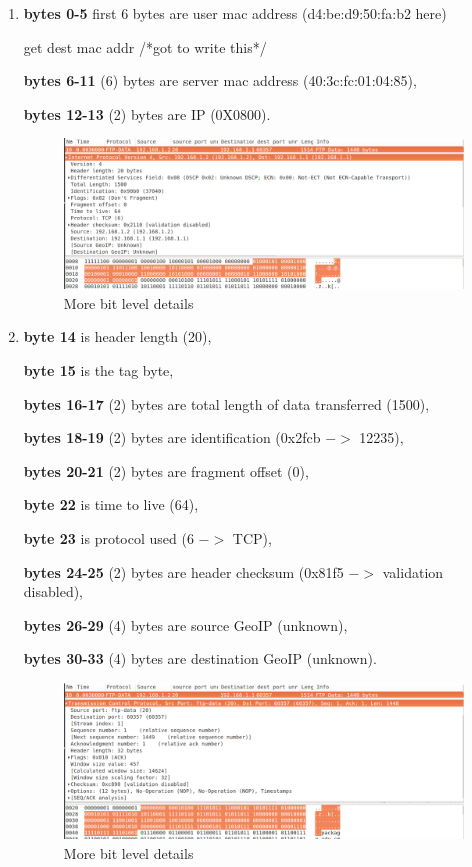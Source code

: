 \begin{enumerate}
\item {\bf bytes 0-5} first 6 bytes are user mac 
address (d4:be:d9:50:fa:b2 here)

\begin{chunk}{get dest mac addr}
/*got to write this*/
\end{chunk}

{\bf bytes 6-11} (6) bytes are server mac 
address (40:3c:fc:01:04:85), 

{\bf bytes 12-13} (2) bytes are IP (0X0800).

\newpage
\begin{figure}[ht!]
\centering
\includegraphics[scale=0.35]{eps/ftp8.eps}
\caption{More bit level details}
\label{ftp8}
\end{figure}

\item {\bf byte 14} is header length (20), 

{\bf byte 15} is the tag byte, 

{\bf bytes 16-17} (2) bytes are total length of data transferred (1500), 

{\bf bytes 18-19} (2) bytes are identification (0x2fcb $->$ 12235), 

{\bf bytes 20-21} (2) bytes are fragment offset (0), 

{\bf byte 22} is time to live (64), 

{\bf byte 23} is protocol used (6 $->$ TCP),

{\bf bytes 24-25} (2) bytes are header checksum 
(0x81f5 $->$ validation disabled),

{\bf bytes 26-29} (4) bytes are source GeoIP (unknown), 

{\bf bytes 30-33} (4) bytes are destination GeoIP (unknown).

\newpage
\begin{figure}[ht!]
\centering
\includegraphics[scale=0.35]{eps/ftp9.eps}
\caption{More bit level details}
\label{ftp9}
\end{figure}


\end{enumerate}
